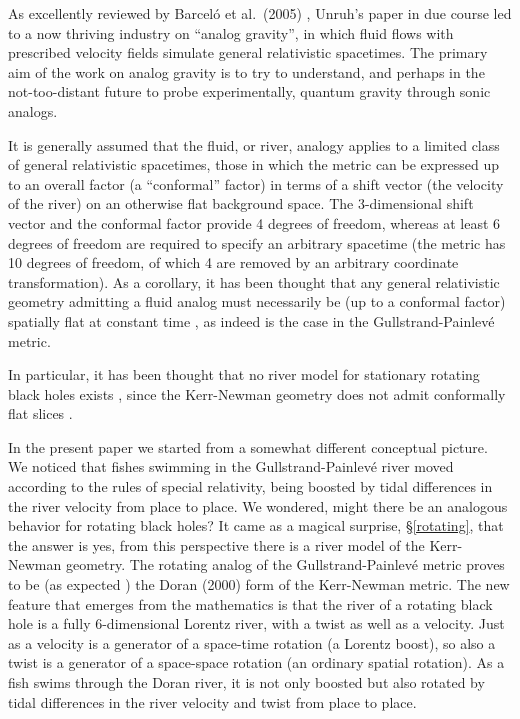 \documentclass[twocolumn,showpacs,preprintnumbers,amsmath,amssymb,prb]{revtex4}
\begin{document}
As excellently reviewed by Barcel\'o et al.\ (2005) \cite{BLV05},
Unruh's paper in due course led to a now thriving industry
on ``analog gravity'',
in which fluid flows with prescribed velocity fields
simulate general relativistic spacetimes.
The primary aim of the work on analog gravity is to try to understand,
and perhaps in the not-too-distant future to probe experimentally,
quantum gravity through sonic analogs.



It is generally assumed that the fluid, or river, analogy
applies to a limited class of general relativistic spacetimes,
those in which the metric can be expressed
up to an overall factor (a ``conformal'' factor)
in terms of a shift vector
(the velocity of the river)
on an otherwise flat background space.
The 3-dimensional shift vector and the conformal factor
provide 4 degrees of freedom,
whereas at least 6 degrees of freedom are required to specify
an arbitrary spacetime
(the metric has 10 degrees of freedom,
of which 4 are removed by an arbitrary coordinate transformation).
As a corollary,
it has been thought that
any general relativistic geometry admitting a fluid analog
must necessarily be (up to a conformal factor) spatially flat at constant time
\cite{VW04,Natario04},
as indeed is the case in the
Gullstrand-Painlev\'e metric.

In particular,
it has been thought that no river model
for stationary rotating black holes
exists \cite{VW04},
since the Kerr-Newman geometry does not admit conformally flat slices
\cite{GP,Kroon}.

In the present paper we started from a somewhat different conceptual picture.
We noticed that fishes swimming in the Gullstrand-Painlev\'e river
moved according to the rules of special relativity,
being boosted by tidal differences in the river velocity
from place to place.
We wondered, might there be an analogous behavior for rotating black holes?
It came as a magical surprise, \S\ref{rotating}, that the answer is yes,
from this perspective
there is a river model of the Kerr-Newman geometry.
The rotating analog of the Gullstrand-Painlev\'e metric
proves to be
(as expected \cite{VW04})
the Doran (2000) \cite{Doran} form of the Kerr-Newman metric.
The new feature that emerges from the mathematics is that
the river of a rotating black hole is a fully 6-dimensional Lorentz river,
with a twist as well as a velocity.
Just as a velocity is a generator of a space-time rotation
(a Lorentz boost),
so also a twist is a generator of a space-space rotation
(an ordinary spatial rotation).
As a fish swims through the Doran river,
it is not only boosted but also rotated
by tidal differences in the river velocity and twist from place to place.
\end{document}
